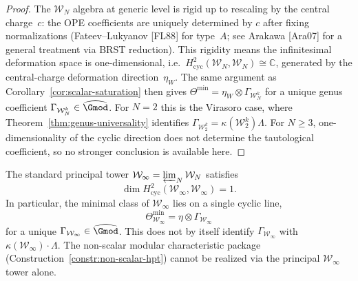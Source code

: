 \begin{proof}
The $\mathcal{W}_N$ algebra at generic level is rigid up to
rescaling by the central charge~$c$: the OPE coefficients are
uniquely determined by $c$ after fixing normalizations
\textup{(}Fateev--Lukyanov \textup{[}FL88\textup{]} for type~$A$;
see Arakawa \textup{[}Ara07\textup{]} for a general treatment
via BRST reduction\textup{)}.  This rigidity means the
infinitesimal deformation space is one-dimensional, i.e.\
$H^2_{\mathrm{cyc}}(\mathcal{W}_N, \mathcal{W}_N) \cong \mathbb{C}$,
generated by the central-charge deformation direction~$\eta_W$.
The same argument as Corollary~\ref{cor:scalar-saturation} then
gives
$\Theta^{\min} = \eta_W \otimes \Gamma_{\mathcal{W}_N^k}$
for a unique genus coefficient
$\Gamma_{\mathcal{W}_N^k}\in\widehat{\Gmod}$.
For $N=2$ this is the Virasoro case, where
Theorem~\ref{thm:genus-universality} identifies
$\Gamma_{\mathcal{W}_2^k}=\kappa(\mathcal{W}_2^k)\Lambda$.
For $N\ge3$, one-dimensionality of the cyclic direction does not
determine the tautological coefficient, so no stronger conclusion is
available here.
\end{proof}

\begin{corollary}
\label{cor:winfty-scalar-saturation}
The standard principal tower
$\mathcal{W}_\infty = \varprojlim_N \mathcal{W}_N$ satisfies
\[
\dim H^2_{\mathrm{cyc}}(\mathcal{W}_\infty, \mathcal{W}_\infty)
= 1.
\]
In particular, the minimal class of $\mathcal{W}_\infty$ lies on a
single cyclic line,
\[
\Theta_{\mathcal{W}_\infty}^{\min}
= \eta \otimes \Gamma_{\mathcal{W}_\infty}
\]
for a unique
$\Gamma_{\mathcal{W}_\infty}\in\widehat{\Gmod}$.
This does not by itself identify
$\Gamma_{\mathcal{W}_\infty}$ with
$\kappa(\mathcal{W}_\infty) \cdot \Lambda$.
The non-scalar modular characteristic package
\textup{(}Construction~\textup{\ref{constr:non-scalar-hpt})}
cannot be realized via the principal
$\mathcal{W}_\infty$ tower alone.
\end{corollary}

